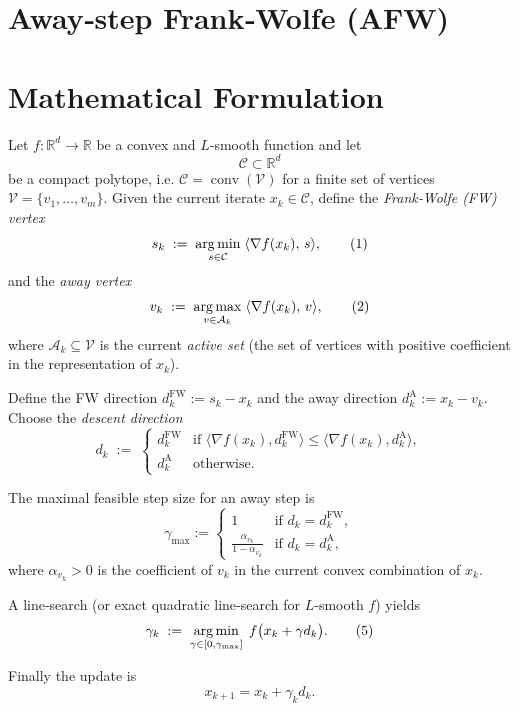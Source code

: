 \documentclass{article}
\newcommand{\argmin}{\operatornamewithlimits{arg\,min}}
\newcommand{\argmax}{\operatornamewithlimits{arg\,max}}
\newcommand{\C}{\mathcal{C}}
\newcommand{\V}{\mathcal{V}}
\newcommand{\A}{\mathcal{A}}
\begin{document}
\section*{Away‑step Frank‑Wolfe (AFW)}

\section*{Mathematical Formulation}
Let $f:\mathbb{R}^d\rightarrow\mathbb{R}$ be a convex and $L$‑smooth function and let
\[
\C \subset \mathbb{R}^d
\]
be a compact polytope, i.e. $\C=\operatorname{conv}(\V)$ for a finite set of vertices $\V=\{v_1,\dots,v_m\}$.
Given the current iterate $x_k\in\C$, define the \emph{Frank‑Wolfe (FW) vertex}
\[
s_k \;:=\; \argmin_{s\in\C}\;\langle \nabla f(x_k),\,s\rangle,
\tag{1}
\]
and the \emph{away vertex}
\[
v_k \;:=\; \argmax_{v\in\A_k}\;\langle \nabla f(x_k),\,v\rangle,
\tag{2}
\]
where $\A_k\subseteq \V$ is the current \emph{active set} (the set of vertices with positive coefficient in the representation of $x_k$).  

Define the FW direction $d^{\text{FW}}_k:=s_k-x_k$ and the away direction $d^{\text{A}}_k:=x_k-v_k$.  
Choose the \emph{descent direction}
\[
d_k \;:=\;
\begin{cases}
d^{\text{FW}}_k & \text{if }\langle \nabla f(x_k),d^{\text{FW}}_k\rangle\le \langle \nabla f(x_k),d^{\text{A}}_k\rangle,\\[4pt]
d^{\text{A}}_k   & \text{otherwise}.
\end{cases}
\tag{3}
\]

The maximal feasible step size for an away step is
\[
\gamma_{\max}:=
\begin{cases}
1 & \text{if }d_k=d^{\text{FW}}_k,\\[4pt]
\displaystyle\frac{\alpha_{v_k}}{1-\alpha_{v_k}} & \text{if }d_k=d^{\text{A}}_k,
\end{cases}
\tag{4}
\]
where $\alpha_{v_k}>0$ is the coefficient of $v_k$ in the current convex combination of $x_k$.

A line‑search (or exact quadratic line‑search for $L$‑smooth $f$) yields
\[
\gamma_k \;:=\;\argmin_{\gamma\in[0,\gamma_{\max}]}\; f\bigl(x_k+\gamma d_k\bigr).
\tag{5}
\]

Finally the update is
\[
x_{k+1}=x_k+\gamma_k d_k.
\tag{6}
\]
\end{document}
